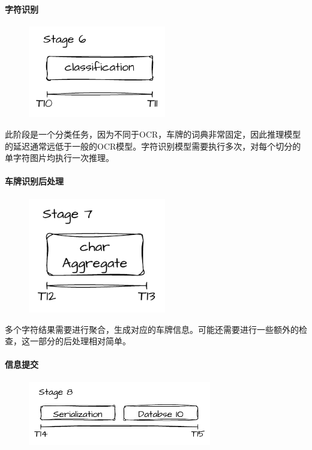 \documentclass[master,anonymous]{shtthesis}
\begin{document}
\paragraph{字符识别}

\begin{figure}[H]
	\centering
	\includegraphics[width=6cm]{img/s6.pdf}
	\label{字符识别阶段}
\end{figure}

此阶段是一个分类任务，因为不同于OCR，车牌的词典非常固定，因此推理模型的延迟通常远低于一般的OCR模型。字符识别模型需要执行多次，对每个切分的单字符图片均执行一次推理。


\paragraph{车牌识别后处理}
\begin{figure}[H]
	\centering
	\includegraphics[width=6cm]{img/s7.pdf}
	\label{车牌识别后处理阶段}
\end{figure}

多个字符结果需要进行聚合，生成对应的车牌信息。可能还需要进行一些额外的检查，这一部分的后处理相对简单。

\paragraph{信息提交}

\begin{figure}[H]
	\centering
	\includegraphics[width=8cm]{img/s8.pdf}
	\label{信息提交阶段}
\end{figure}
\end{document}
